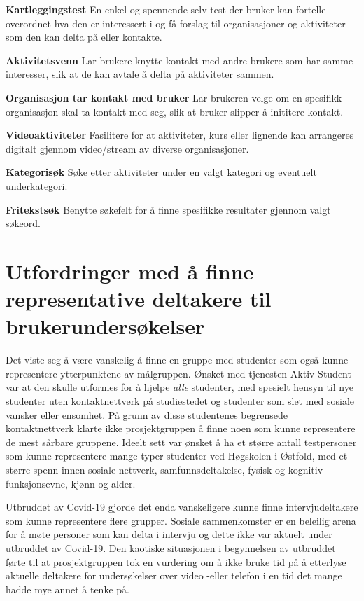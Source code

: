 \begin{compactitem}
\item[{\bf Kartleggingstest}] En enkel og spennende selv-test der bruker kan fortelle overordnet hva den er interessert i og få forslag til organisasjoner og aktiviteter som den kan delta på eller kontakte.
\item[{\bf Aktivitetsvenn}] Lar brukere knytte kontakt med andre brukere som har samme interesser, slik at de kan avtale å delta på aktiviteter sammen.
\item[{\bf Organisasjon tar kontakt med bruker}] Lar brukeren velge om en spesifikk organisasjon skal ta kontakt med seg, slik at bruker slipper å inititere kontakt.
\item[{\bf Videoaktiviteter}] Fasilitere for at aktiviteter, kurs eller lignende kan arrangeres digitalt gjennom video/stream av diverse organisasjoner.
\item[{\bf Kategorisøk}] Søke etter aktiviteter under en valgt kategori og eventuelt underkategori.
\item[{\bf Fritekstsøk}] Benytte søkefelt for å finne spesifikke resultater gjennom valgt søkeord.
\end{compactitem}

\section{Utfordringer med å finne representative deltakere til brukerundersøkelser}
Det viste seg å være vanskelig å finne en gruppe med studenter som også kunne representere ytterpunktene av målgruppen. Ønsket med tjenesten Aktiv Student var at den skulle utformes for å hjelpe {\em  alle} studenter, med spesielt hensyn til nye studenter uten kontaktnettverk på studiestedet og studenter som slet med sosiale vansker eller ensomhet. På grunn av disse studentenes begrensede kontaktnettverk klarte ikke prosjektgruppen å finne noen som kunne representere de mest sårbare gruppene. Ideelt sett var ønsket å ha et større antall testpersoner som kunne representere mange typer studenter ved Høgskolen i Østfold, med et større spenn innen sosiale nettverk, samfunnsdeltakelse, fysisk og kognitiv funksjonsevne, kjønn og alder.

Utbruddet av Covid-19 gjorde det enda vanskeligere kunne finne intervjudeltakere som kunne representere flere grupper. Sosiale sammenkomster er en beleilig arena for å møte personer som kan delta i intervju og dette ikke var aktuelt under utbruddet av Covid-19. Den kaotiske situasjonen i begynnelsen av utbruddet førte til at prosjektgruppen tok en vurdering om å ikke bruke tid på å etterlyse aktuelle deltakere for undersøkelser over video -eller telefon i en tid det mange hadde mye annet å tenke på. 

